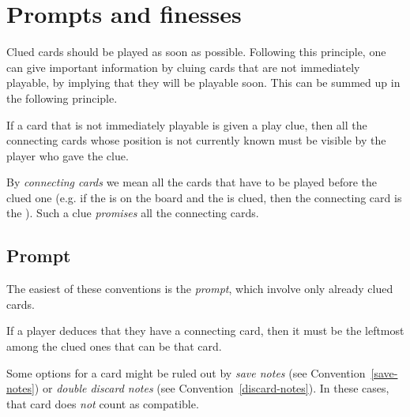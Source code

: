 \section{Prompts and finesses}

Clued cards should be played as soon as possible. Following this principle, one can give important information by cluing cards that are not immediately playable, by implying that they will be playable soon. This can be summed up in the following principle.

\begin{convention}
	\label{connection-principle}
	If a card that is not immediately playable is given a play clue, then all the connecting cards whose position is not currently known must be visible by the player who gave the clue.
\end{convention}

By \emph{connecting cards} we mean all the cards that have to be played before the clued one (e.g. if the  is on the board and the  is clued, then the connecting card is the ). Such a clue \emph{promises} all the connecting cards.

\subsection{Prompt}

The easiest of these conventions is the \emph{prompt}, which involve only already clued cards.

\begin{convention}[Prompt]
	\label{prompt}
	If a player deduces that they have a connecting card, then it must be the leftmost among the clued ones that can be that card.
\end{convention}

\begin{remark}
	Some options for a card might be ruled out by \emph{save notes} (see Convention~\ref{save-notes}) or \emph{double discard notes} (see Convention~\ref{discard-notes}). In these cases, that card does \emph{not} count as compatible.
\end{remark}


